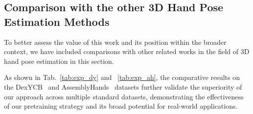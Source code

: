 \subsection{Comparison with the other 3D Hand Pose Estimation Methods}




To better assess the value of this work and its position within the broader context, we have included comparisons with other related works in the field of 3D hand pose estimation in this section.

As shown in Tab.~\ref{tab:exp_dy} and ~\ref{tab:exp_ah}, the comparative results on the DexYCB~\citep{chao:cvpr21} and AssemblyHands~\citep{ohkawa:cvpr23} datasets further validate the superiority of our approach across multiple standard datasets, demonstrating the effectiveness of our pretraining strategy and its broad potential for real-world applications.

